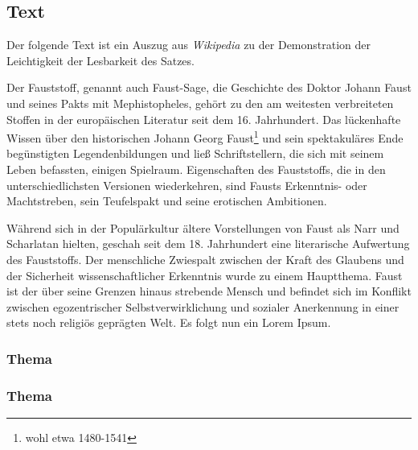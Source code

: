 \subsection{Text}
Der folgende Text ist ein Auszug aus \textit{Wikipedia} zu der Demonstration der Leichtigkeit der Lesbarkeit des Satzes.

Der Fauststoff, genannt auch Faust-Sage, die Geschichte des Doktor Johann Faust und seines Pakts mit Mephistopheles, gehört zu den am weitesten verbreiteten Stoffen in der europäischen Literatur seit dem 16. Jahrhundert. Das lückenhafte Wissen über den historischen Johann Georg Faust\footnote{wohl etwa 1480-1541} und sein spektakuläres Ende begünstigten Legendenbildungen und ließ Schriftstellern, die sich mit seinem Leben befassten, einigen Spielraum. Eigenschaften des Fauststoffs, die in den unterschiedlichsten Versionen wiederkehren, sind Fausts Erkenntnis- oder Machtstreben, sein Teufelspakt und seine erotischen Ambitionen.

Während sich in der Populärkultur ältere Vorstellungen von Faust als Narr und Scharlatan hielten, geschah seit dem 18. Jahrhundert eine literarische Aufwertung des Fauststoffs. Der menschliche Zwiespalt zwischen der Kraft des Glaubens und der Sicherheit wissenschaftlicher Erkenntnis wurde zu einem Hauptthema. Faust ist der über seine Grenzen hinaus strebende Mensch und befindet sich im Konflikt zwischen egozentrischer Selbstverwirklichung und sozialer Anerkennung in einer stets noch religiös geprägten Welt.
Es folgt nun ein Lorem Ipsum.

\lipsum[1]

\subsubsection{Thema}
\lipsum[2-4]
\subsubsection{Thema}
\lipsum[5-7]
